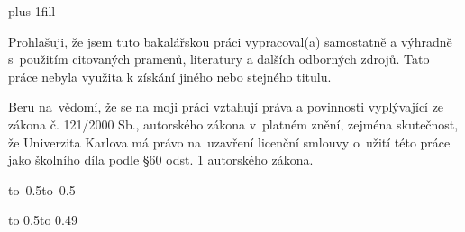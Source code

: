 \newpage



\openright
\hypersetup{pageanchor=true}
\pagestyle{plain}
\vglue 0pt plus 1fill

\noindent
Prohlašuji, že jsem tuto bakalářskou práci vypracoval(a) samostatně a výhradně
s~použitím citovaných pramenů, literatury a dalších odborných zdrojů.
Tato práce nebyla využita k získání jiného nebo stejného titulu.

\medskip\noindent
Beru na~vědomí, že se na moji práci vztahují práva a povinnosti vyplývající
ze zákona č. 121/2000 Sb., autorského zákona v~platném znění, zejména skutečnost,
že Univerzita Karlova má právo na~uzavření licenční smlouvy o~užití této
práce jako školního díla podle §60 odst. 1 autorského zákona.

\vspace{10mm}

\hbox{\hbox to 0.5\hbox to 0.5}

\vspace{20mm}
\newpage


\openright

\noindent
\Podekovani

\newpage


\openright

\vbox to 0.5\nobreak\vbox to 0.49

\newpage

\openright
\pagestyle{plain}
\setcounter{page}{1}
